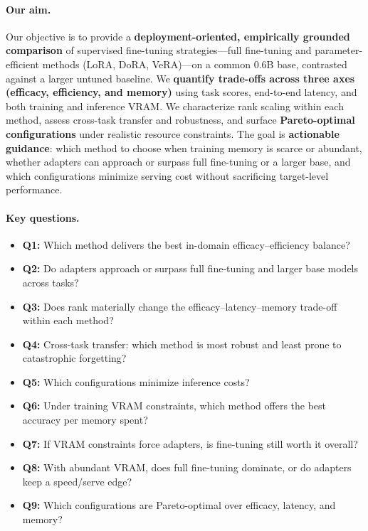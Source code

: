 \documentclass[11pt,a4paper]{article}
\begin{document}
\paragraph{Our aim.}
Our objective is to provide a \textbf{deployment-oriented, empirically grounded comparison} of supervised fine-tuning strategies—full fine-tuning and parameter-efficient methods (LoRA, DoRA, VeRA)—on a common 0.6B base, contrasted against a larger untuned baseline. We \textbf{quantify trade-offs across three axes (efficacy, efficiency, and memory)} using task scores, end-to-end latency, and both training and inference VRAM. We characterize rank scaling within each method, assess cross-task transfer and robustness, and surface \textbf{Pareto-optimal configurations} under realistic resource constraints. The goal is \textbf{actionable guidance}: which method to choose when training memory is scarce or abundant, whether adapters can approach or surpass full fine-tuning or a larger base, and which configurations minimize serving cost without sacrificing target-level performance.

\paragraph{Key questions.}
\begin{itemize}
\item \textbf{Q1:} Which method delivers the best in-domain efficacy–efficiency balance?
\item \textbf{Q2:} Do adapters approach or surpass full fine-tuning and larger base models across tasks?
\item \textbf{Q3:} Does rank materially change the efficacy–latency–memory trade-off within each method?
\item \textbf{Q4:} Cross-task transfer: which method is most robust and least prone to catastrophic forgetting?
\item \textbf{Q5:} Which configurations minimize inference costs?
\item \textbf{Q6:} Under training VRAM constraints, which method offers the best accuracy per memory spent?
\item \textbf{Q7:} If VRAM constraints force adapters, is fine-tuning still worth it overall?
\item \textbf{Q8:} With abundant VRAM, does full fine-tuning dominate, or do adapters keep a speed/serve edge?
\item \textbf{Q9:} Which configurations are Pareto-optimal over efficacy, latency, and memory?
\end{itemize}
\end{document}
